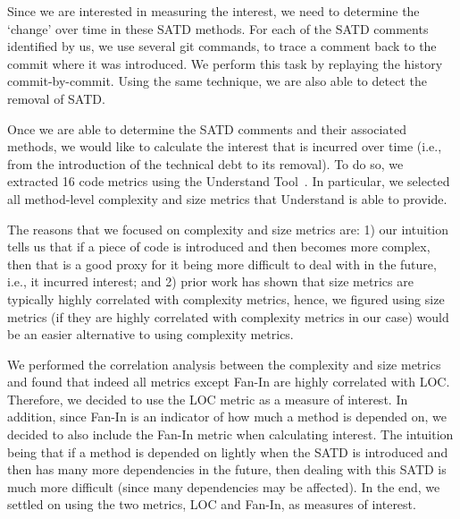 Since we are interested in measuring the interest, we need to determine the `change' over time in these SATD methods. For each of the SATD comments identified by us, we use several git commands, to trace a comment back to the commit where it was introduced. We perform this task by replaying the history commit-by-commit. Using the same technique, we are also able to detect the removal of SATD.

Once we are able to determine the SATD comments and their associated methods, we would like to calculate the interest that is incurred over time (i.e., from the introduction of the technical debt to its removal). To do so, we extracted 16 code metrics using the {\sc Understand Tool}~\cite{Understand}. In particular, we selected all method-level complexity and size metrics that Understand is able to provide.

The reasons that we focused on complexity and size metrics are: 1) our intuition tells us that if a piece of code is introduced and then becomes more complex, then that is a good proxy for it being more difficult to deal with in the future, i.e., it incurred interest; and 2) prior work has shown that size metrics are typically highly correlated with complexity metrics, hence, we figured using size metrics (if they are highly correlated with complexity metrics in our case) would be an easier alternative to using complexity metrics.

We performed the correlation analysis between the complexity and size metrics and found that indeed all metrics except Fan-In are highly correlated with LOC. Therefore, we decided to use the LOC metric as a measure of interest. In addition, since Fan-In is an indicator of how much a method is depended on, we decided to also include the Fan-In metric when calculating interest. The intuition being that if a method is depended on lightly when the SATD is introduced and then has many more dependencies in the future, then dealing with this SATD is much more difficult (since many dependencies may be affected). In the end, we settled on using the two metrics, LOC and Fan-In, as measures of interest.

